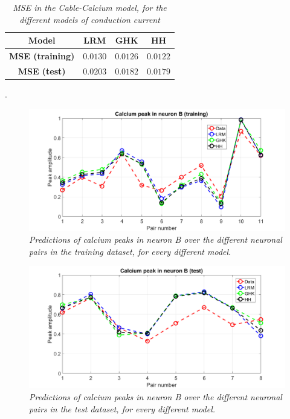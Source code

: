 \documentclass[11pt,a4paper,twocolumn]{article}
\begin{document}
\begin{table} [H]
	\centering
	\begin{tabular}{ |c|c|c|c| } 
		
		\hline
		\textbf{Model} & \textbf{LRM} & \textbf{GHK} & \textbf{HH} \\
		\hline
		\textbf{MSE (training)}  & $0.0130$ & $0.0126$ & $0.0122$  \\
		\hline
		\textbf{MSE (test)}  & $0.0203$ & $0.0182$ & $0.0179$  \\
		\hline
		
		
	\end{tabular} \caption{\textit{{MSE in the Cable-Calcium model, for the different models of conduction current}}}.\label{results}
\end{table}

\begin{figure}[H]
	\begin{center}
		\hspace*{-0.5 cm}
		\includegraphics[scale=0.25]{training.png} 
	\end{center} 
	\caption{\textit{Predictions of calcium peaks in neuron B over the different neuronal pairs in the training dataset, for every different model.}}
	\label{training}
\end{figure}

\begin{figure}[H]
	\begin{center}
		\hspace*{-0.5 cm}
		\includegraphics[scale=0.25]{test_model.png} 
	\end{center} 
	\caption{\textit{Predictions of calcium peaks in neuron B over the different neuronal pairs in the test dataset, for every different model.}}
	\label{test}
\end{figure}
\end{document}
